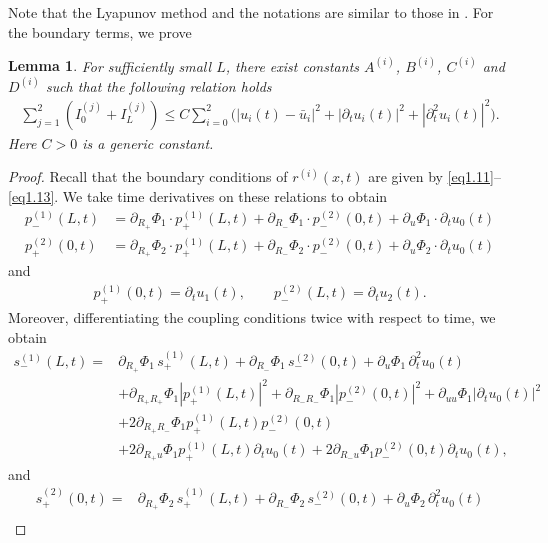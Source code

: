 \documentclass[12pt]{article}
\newtheorem{lemma}[theorem]{Lemma}
\numberwithin{equation}{section}
\begin{document}
Note that the Lyapunov method and the notations are similar to those in \cite{MR2996527}. 
For the boundary terms, we prove
\begin{lemma}
For sufficiently small $L$, there exist constants $A^{(i)}$, $B^{(i)}$, $C^{(i)}$ and $D^{(i)}$ such that the following relation holds 
\begin{align}\label{lemma3.2-eq1} 
\sum_{j=1}^2\left(I^{(j)}_0+I^{(j)}_L\right)\leq C\sum_{i=0}^2\Big(|u_i(t)-\bar{u}_i|^2+|\partial_tu_i(t)|^2+|\partial_t^2u_i(t)|^2\Big).
\end{align}
Here $C>0$ is a generic constant.
\end{lemma}
\begin{proof}
Recall that the boundary conditions of $r^{(i)}(x,t)$ are given by \eqref{eq1.11}--\eqref{eq1.13}. We take time derivatives on these relations to obtain
\begin{align}
    p_-^{(1)}(L,t)&=\partial_{R_+}\Phi_1\cdot p_+^{(1)}(L,t) + \partial_{R_-}\Phi_1\cdot p_-^{(2)}(0,t)  +\partial_{u}\Phi_1\cdot \partial_tu_0(t)\label{eq-p1}\\[2mm]
    p_+^{(2)}(0,t)&=\partial_{R_+}\Phi_2\cdot p_+^{(1)}(L,t) + \partial_{R_-}\Phi_2\cdot p_-^{(2)}(0,t)  +\partial_{u}\Phi_2\cdot \partial_tu_0(t)\label{eq-p2}
\end{align}
and
\begin{align}
    p_+^{(1)}(0,t)=\partial_tu_1(t),\qquad
    p_-^{(2)}(L,t)=\partial_tu_2(t).
\end{align}
Moreover, differentiating the coupling conditions twice with
respect to time, we obtain
\begin{align}
s_-^{(1)}(L,t)
={}&
\partial_{R_+}\Phi_1\,s_+^{(1)}(L,t)
+\partial_{R_-}\Phi_1\,s_-^{(2)}(0,t)
+\partial_u\Phi_1\,\partial_t^2u_0(t)
\nonumber\\
&+
\partial_{R_+R_+}\Phi_1
\left|p_+^{(1)}(L,t)\right|^2
+
\partial_{R_-R_-}\Phi_1
\left|p_-^{(2)}(0,t)\right|^2
+
\partial_{uu}\Phi_1
\left|\partial_tu_0(t)\right|^2
\nonumber\\
&+
2\partial_{R_+R_-}\Phi_1
p_+^{(1)}(L,t)p_-^{(2)}(0,t)
\nonumber\\
&+
2\partial_{R_+u}\Phi_1
p_+^{(1)}(L,t)\partial_tu_0(t)
+
2\partial_{R_-u}\Phi_1
p_-^{(2)}(0,t)\partial_tu_0(t),
\label{eq-s1}
\end{align}
and
\begin{align}
s_+^{(2)}(0,t)
={}&
\partial_{R_+}\Phi_2\,s_+^{(1)}(L,t)
+\partial_{R_-}\Phi_2\,s_-^{(2)}(0,t)
+\partial_u\Phi_2\,\partial_t^2u_0(t)
\nonumber\\

\end{align}
\end{proof}
\end{document}
